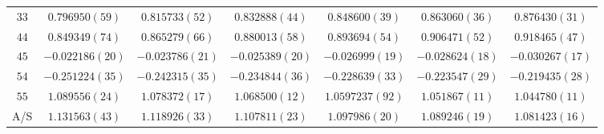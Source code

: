 \begin{table}
\begin{center}
\begin{tabular}{c|c c c c c c}
$33$ & $0.796950(59)$ & $0.815733(52)$ & $0.832888(44)$ & $0.848600(39)$ & $0.863060(36)$ & $0.876430(31)$ \\
$44$ & $0.849349(74)$ & $0.865279(66)$ & $0.880013(58)$ & $0.893694(54)$ & $0.906471(52)$ & $0.918465(47)$ \\
$45$ & $-0.022186(20)$ & $-0.023786(21)$ & $-0.025389(20)$ & $-0.026999(19)$ & $-0.028624(18)$ & $-0.030267(17)$ \\
$54$ & $-0.251224(35)$ & $-0.242315(35)$ & $-0.234844(36)$ & $-0.228639(33)$ & $-0.223547(29)$ & $-0.219435(28)$ \\
$55$ & $1.089556(24)$ & $1.078372(17)$ & $1.068500(12)$ & $1.0597237(92)$ & $1.051867(11)$ & $1.044780(11)$ \\
\hline
A/S & $1.131563(43)$ & $1.118926(33)$ & $1.107811(23)$ & $1.097986(20)$ & $1.089246(19)$ & $1.081423(16)$ \\
\hline
\hline
\end{tabular}
\end{center}
\end{table}